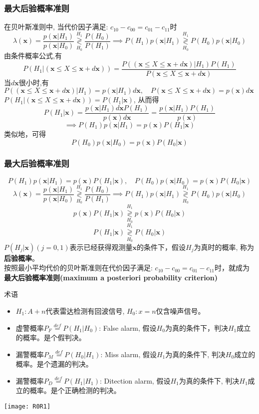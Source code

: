 \begin{frame}[shrink]
\frametitle{最大后验概率准则}
在贝叶斯准则中, 当代价因子满足: $c_{10}-c_{00}=c_{01}-c_{11}$时 
\[\lambda(\bm{x})=\frac{p(\bm{x}|H_1)}{p(\bm{x}|H_0)}\mathop{\gtrless}\limits_{H_0}^{H_1}\frac{P(H_0)}{P(H_1)}\implies P(H_1)p(\bm{x}|H_1)\mathop{\gtrless}\limits_{H_0}^{H_1}P(H_0)p(\bm{x}|H_0)\]
由条件概率公式,有
\[P(H_1|(\bm{x}\le X\le \bm{x}+d\bm{x}))=\frac{P((\bm{x}\le X\le \bm{x}+d\bm{x})|H_1)P(H_1)}{P(\bm{x}\le X\le \bm{x}+d\bm{x})}\]
当$d\bm{x}$很小时,有$P((\bm{x}\le X\le \bm{x}+d\bm{x})|H_1)=p(\bm{x}|H_1)d\bm{x},\quad P(\bm{x}\le X\le \bm{x}+d\bm{x})=p(\bm{x})d\bm{x}$\\
$P(H_1|(\bm{x}\le X\le \bm{x}+d\bm{x}))=P(H_1|\bm{x})$, 从而得
\[P(H_1|\bm{x})=\frac{p(\bm{x}|H_1)d\bm{x}P(H_1)}{p(\bm{x})d\bm{x}}=\frac{p(\bm{x}|H_1)P(H_1)}{p(\bm{x})}\]
\[\implies P(H_1)p(\bm{x}|H_1)=p(\bm{x})P(H_1|\bm{x}) \]
类似地，可得
\[P(H_0)p(\bm{x}|H_0)=p(\bm{x})P(H_0|\bm{x}) \]
\end{frame}

\begin{frame}[shrink]
\frametitle{最大后验概率准则}
\[P(H_1)p(\bm{x}|H_1)=p(\bm{x})P(H_1|\bm{x}),\quad P(H_0)p(\bm{x}|H_0)=p(\bm{x})P(H_0|\bm{x}) \]
\[\lambda(\bm{x})=\frac{p(\bm{x}|H_1)}{p(\bm{x}|H_0)}\mathop{\gtrless}\limits_{H_0}^{H_1}\frac{P(H_0)}{P(H_1)}\implies P(H_1)p(\bm{x}|H_1)\mathop{\gtrless}\limits_{H_0}^{H_1}P(H_0)p(\bm{x}|H_0)\]
\[p(\bm{x})P(H_1|\bm{x})\mathop{\gtrless}\limits_{H_0}^{H_1}p(\bm{x})P(H_0|\bm{x}) \]
\[P(H_1|\bm{x})\mathop{\gtrless}\limits_{H_0}^{H_1}P(H_0|\bm{x}) \]
$P(H_j|\bm{x})(j=0,1)$表示已经获得观测量$\bm{x}$的条件下，假设$H_j$为真时的概率, 称为\textbf{后验概率}。\\
按照最小平均代价的贝叶斯准则在代价因子满足: $c_{10}-c_{00}=c_{01}-c_{11}$时，就成为\textbf{最大后验概率准则(maximum a posteriori probability criterion)} 
\end{frame}

\begin{frame}{术语}
\begin{itemize}
	\item $H_1: A+n$代表雷达检测有回波信号, $H_0: x=n$仅含噪声信号。
	\item 虚警概率$P_F\mathop{=}\limits^{def}P(H_1|H_0)$: False alarm, 假设$H_0$为真的条件下，判决$H_1$成立的概率。是个假判决。
	\item 漏警概率$P_M\mathop{=}\limits^{def}P(H_0|H_1)$: Miss alarm, 假设$H_1$为真的条件下, 判决$H_0$成立的概率。是个遗漏的判决。
	\item 漏警概率$P_D\mathop{=}\limits^{def}P(H_1|H_1)$: Ditection alarm, 假设$H_1$为真的条件下, 判决$H_1$成立的概率。是个正确检测的判决。
\end{itemize}
\texttt{[image: R0R1]}
\end{frame}

